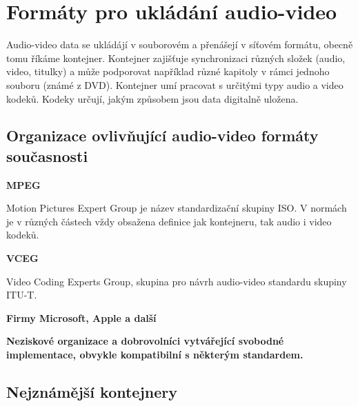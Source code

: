 \chapter{Formáty pro ukládání audio-video}

\vspace{10pt}

Audio-video data se ukládájí v souborovém a přenášejí v síťovém formátu, obecně tomu říkáme kontejner. Kontejner zajišťuje synchronizaci různých složek (audio, video, titulky) a může podporovat například různé kapitoly v rámci jednoho souboru (známé z DVD). Kontejner umí pracovat s určitými typy audio a video kodeků. Kodeky určují, jakým způsobem jsou data digitalně uložena. 

\vspace{10pt}

\section{Organizace ovlivňující audio-video formáty současnosti}

\vspace{10pt}

\textbf{MPEG}

Motion Pictures Expert Group je název standardizační skupiny ISO. V normách je v různých částech vždy obsažena definice jak kontejneru, tak audio i video kodeků.

\vspace{10pt}

\textbf{VCEG}

Video Coding Experts Group, skupina pro návrh audio-video standardu skupiny ITU-T.

\vspace{10pt}

\textbf{Firmy Microsoft, Apple a další}

\vspace{10pt}

\textbf{Neziskové organizace a dobrovolníci vytvářející svobodné implementace, obvykle kompatibilní s některým standardem.}

\vspace{10pt}

\section{Nejznámější kontejnery}

\vspace{10pt}

